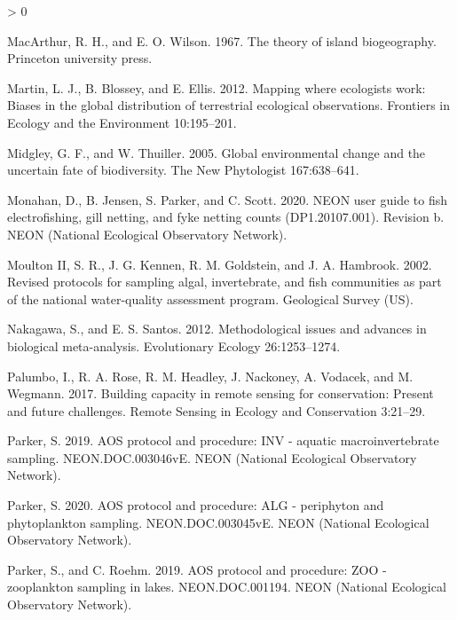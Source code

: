 \documentclass[
  12pt,
]{article}
\newlength{\cslhangindent}
\newenvironment{CSLReferences}[2] %
 {%
  \setlength{\parindent}{0pt}
  \ifodd #1 \everypar{\setlength{\hangindent}{\cslhangindent}}\ignorespaces\fi
  \ifnum #2 > 0
  \setlength{\parskip}{#2\baselineskip}
  \fi
 }%
 {}
\begin{document}
\begin{CSLReferences}{1}{0}
\leavevmode\hypertarget{ref-macarthur1967theory}{}%
MacArthur, R. H., and E. O. Wilson. 1967. The theory of island biogeography. Princeton university press.

\leavevmode\hypertarget{ref-martin2012mapping}{}%
Martin, L. J., B. Blossey, and E. Ellis. 2012. Mapping where ecologists work: Biases in the global distribution of terrestrial ecological observations. Frontiers in Ecology and the Environment 10:195--201.

\leavevmode\hypertarget{ref-midgley2005global}{}%
Midgley, G. F., and W. Thuiller. 2005. Global environmental change and the uncertain fate of biodiversity. The New Phytologist 167:638--641.

\leavevmode\hypertarget{ref-Monahan2020}{}%
Monahan, D., B. Jensen, S. Parker, and C. Scott. 2020. NEON user guide to fish electrofishing, gill netting, and fyke netting counts (DP1.20107.001). Revision b. NEON (National Ecological Observatory Network).

\leavevmode\hypertarget{ref-moulton2002revised}{}%
Moulton II, S. R., J. G. Kennen, R. M. Goldstein, and J. A. Hambrook. 2002. Revised protocols for sampling algal, invertebrate, and fish communities as part of the national water-quality assessment program. Geological Survey (US).

\leavevmode\hypertarget{ref-nakagawa2012methodological}{}%
Nakagawa, S., and E. S. Santos. 2012. Methodological issues and advances in biological meta-analysis. Evolutionary Ecology 26:1253--1274.

\leavevmode\hypertarget{ref-palumbo2017building}{}%
Palumbo, I., R. A. Rose, R. M. Headley, J. Nackoney, A. Vodacek, and M. Wegmann. 2017. Building capacity in remote sensing for conservation: Present and future challenges. Remote Sensing in Ecology and Conservation 3:21--29.

\leavevmode\hypertarget{ref-Parker2019}{}%
Parker, S. 2019. AOS protocol and procedure: INV - aquatic macroinvertebrate sampling. NEON.DOC.003046vE. NEON (National Ecological Observatory Network).

\leavevmode\hypertarget{ref-Parker2020}{}%
Parker, S. 2020. AOS protocol and procedure: ALG - periphyton and phytoplankton sampling. NEON.DOC.003045vE. NEON (National Ecological Observatory Network).

\leavevmode\hypertarget{ref-ParkerRoehm2019}{}%
Parker, S., and C. Roehm. 2019. AOS protocol and procedure: ZOO - zooplankton sampling in lakes. NEON.DOC.001194. NEON (National Ecological Observatory Network).


\end{CSLReferences}
\end{document}
